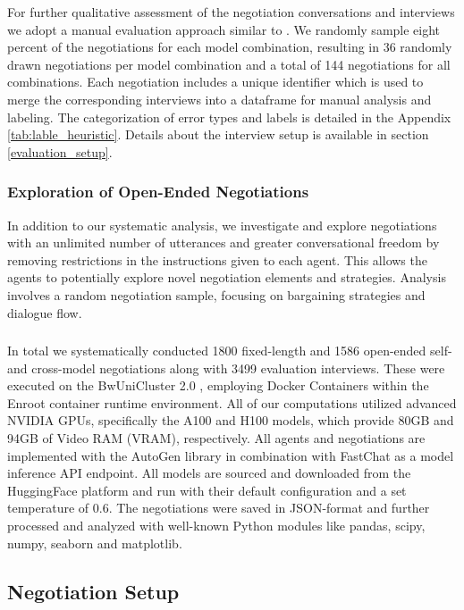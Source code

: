 \documentclass[runningheads]{llncs}
\begin{document}
For further qualitative assessment of the negotiation conversations and interviews we adopt a manual evaluation approach similar to \cite{park_generative_2023}. We randomly sample eight percent of the negotiations for each model combination, resulting in 36 randomly drawn negotiations per model combination and a total of 144 negotiations for all combinations. Each negotiation includes a unique identifier which is used to merge the corresponding interviews into a dataframe for manual analysis and labeling. The categorization of error types and labels is detailed in the Appendix  \ref{tab:lable_heuristic}. Details about the interview setup is available in section \ref{evaluation_setup}.

\subsubsection{Exploration of Open-Ended Negotiations} In addition to our systematic analysis, we investigate and explore negotiations with an unlimited number of utterances and greater conversational freedom by removing restrictions in the instructions given to each agent. This allows the agents to potentially explore novel negotiation elements and strategies. Analysis involves a random negotiation sample, focusing on bargaining strategies and dialogue flow.

\subsubsection{} In total we systematically conducted 1800 fixed-length and 1586 open-ended self- and cross-model negotiations along with 3499 evaluation interviews. These were executed on the BwUniCluster 2.0 \cite{noauthor_bwunicluster20_nodate}, employing Docker Containers within the Enroot container runtime environment. All of our computations utilized advanced NVIDIA GPUs, specifically the A100 and H100 models, which provide 80GB and 94GB of Video RAM (VRAM), respectively. All agents and negotiations are implemented with the AutoGen library \cite{wu_autogen_2023} in combination with FastChat \cite{zheng_judging_2023} as a model inference API endpoint. All models are sourced and downloaded from the HuggingFace \cite{noauthor_open_nodate} platform and run with their default configuration and a set temperature of 0.6. The negotiations were saved in JSON-format and further processed and analyzed with well-known Python modules like pandas, scipy, numpy, seaborn and matplotlib.

\subsection{Negotiation Setup}\label{negotiation_setup}
\end{document}

